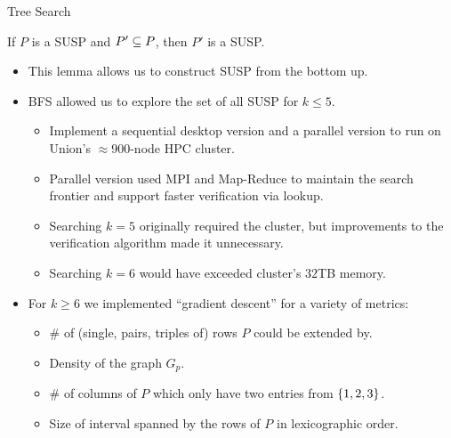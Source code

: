 \documentclass[t,10pt,
mathserif,xcolor=dvipsnames]{beamer}
\begin{document}
\begin{myframe}{Tree Search}

  \begin{lemma}
    If $P$ is a SUSP and $P' \subseteq P$, then $P'$ is a SUSP.
  \end{lemma}

  \begin{itemize}
  \item This lemma allows us to construct SUSP from the bottom up.

    \pause
    \medskip
  \item BFS allowed us to explore the set of all SUSP for $k
    \le 5$.
    \begin{itemize}
    \item Implement a sequential desktop version and a parallel
      version to run on Union's $\approx$900-node HPC cluster.
    \item Parallel version used MPI and Map-Reduce to maintain the
      search frontier and support faster verification via lookup.
    \item Searching $k = 5$ originally required the cluster, but
      improvements to the verification algorithm made it
      unnecessary.
    \item Searching $k = 6$ would have exceeded cluster's $32$TB memory.
    \end{itemize}

    \pause
    \medskip
  \item For $k \ge 6$ we implemented ``gradient descent'' for a variety of
    metrics:
    \begin{itemize}
    \item \# of (single, pairs, triples of) rows $P$ could be extended by.
    \item Density of the graph $G_p$.
    \item \# of columns of $P$ which only have two entries from
      $\{{1,2,3}\}$.
    \item Size of interval spanned by the rows of $P$ in lexicographic
      order.
    \end{itemize}
  \end{itemize}
  
\end{myframe}

\subsection{}
\end{document}
